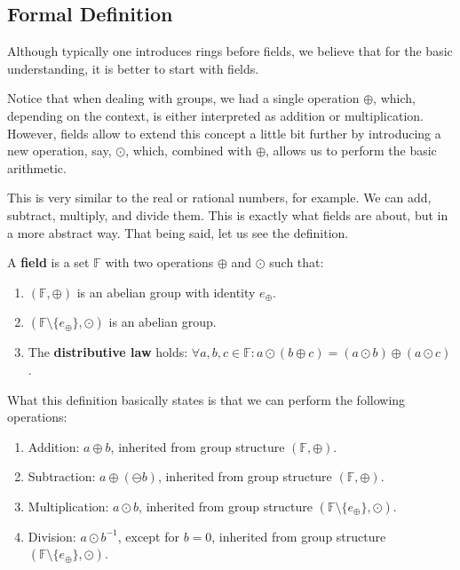 \documentclass[../lecture-notes.tex]{subfiles}
\begin{document}
\subsection{Formal Definition}
Although typically one introduces rings before fields, we believe that for the basic understanding, it is better to start with fields. 

Notice that when dealing with groups, we had a single operation $\oplus$, which, depending on the context, is either interpreted as addition or multiplication. 
However, fields allow to extend this concept a little bit further by introducing a new operation, say, $\odot$, which, combined with $\oplus$, allows us to perform the basic arithmetic.

This is very similar to the real or rational numbers, for example. We can add, subtract, multiply, and divide them. This is exactly what fields are about, but in a more abstract way. That being said, let us see the definition.

\begin{definition}
    A \textbf{field} is a set $\mathbb{F}$ with two operations $\oplus$ and $\odot$ such that:
    \begin{enumerate}
        \item $(\mathbb{F}, \oplus)$ is an abelian group with identity $e_{\oplus}$.
        \item $(\mathbb{F} \setminus \{e_{\oplus}\}, \odot)$ is an abelian group.
        \item The \textbf{distributive law} holds: $\forall a,b,c \in \mathbb{F}: a \odot (b \oplus c) = (a \odot b) \oplus (a \odot c)$.
    \end{enumerate}
\end{definition}

What this definition basically states is that we can perform the following operations:
\begin{enumerate}
    \item Addition: $a \oplus b$, inherited from group structure $(\mathbb{F}, \oplus)$.
    \item Subtraction: $a \oplus (\ominus b)$, inherited from group structure $(\mathbb{F}, \oplus)$.
    \item Multiplication: $a \odot b$, inherited from group structure $(\mathbb{F} \setminus \{e_{\oplus}\}, \odot)$.
    \item Division: $a \odot b^{-1}$, except for $b=0$, inherited from group structure $(\mathbb{F} \setminus \{e_{\oplus}\}, \odot)$.
\end{enumerate}
\end{document}
